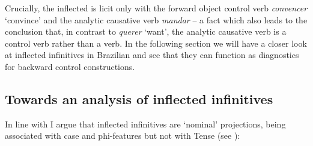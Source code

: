 \documentclass[output=paper]{langsci/langscibook}
\begin{document}
Crucially, the inflected  is licit only with the forward object control verb \textit{convencer} ‘convince’ and the analytic causative verb \textit{mandar} – a fact which also leads to the conclusion that, in contrast to \textit{querer} ‘want’, the analytic causative verb is a control verb rather than a  verb. In the following section we will have a closer look at inflected infinitives in Brazilian  and see that they can function as diagnostics for backward control constructions.

\subsection{Towards an analysis of inflected infinitives}%

In line with \citet{Raposo1987} I argue that inflected infinitives are ‘nominal’ projections, being associated with case and phi-features but not with Tense (see \citealt{Stowell1982}):

\ea%
    \label{ex:moreno:27}
    \z
\z
\end{document}

